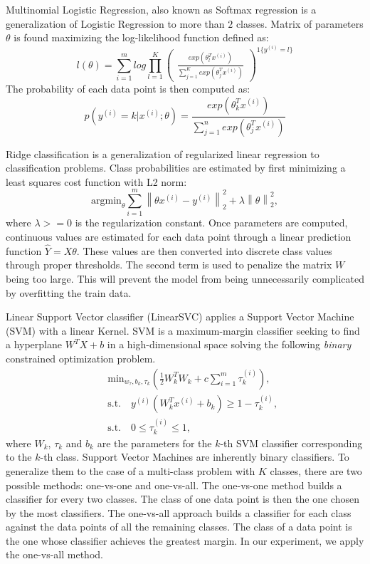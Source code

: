 Multinomial Logistic Regression, also known as Softmax regression is a generalization of Logistic Regression to more than $2$ classes.
Matrix of parameters $\theta$ is found maximizing the log-likelihood function defined as:
\begin{equation*}
	l(\theta) = \sum_{i=1}^{m} log \prod_{l=1}^K \begin{pmatrix}
\frac{exp(\theta_l^Tx^{(i)})}{\sum_{j=1}^K exp(\theta_j^Tx^{(i)})}
\end{pmatrix}^{1\{y^{(i)}=l\}}
\label{eq:softmax-likelihood}
\end{equation*}
The probability of each data point is then computed as:
\begin{equation*}
 p(y^{(i)}=k|x^{(i)};\theta)=\frac{exp(\theta^T_k x^{(i)})}{\sum_{j = 1}^{n} exp(\theta_j^T x^{(i)})}
\label{eq:softmax-prob}
\end{equation*}

Ridge classification is a generalization of regularized linear regression to classification problems.
Class probabilities are estimated by first minimizing a least squares cost function with L2 norm:
\begin{equation*}
\mathrm{argmin}_{\theta}\sum_{i = 1}^{m} \left\| \theta x^{(i)}-y^{(i)}\right\|_2^2 + \lambda \left\| \theta \right\|_2^2,
\label{eq:ridge-cost}
\end{equation*}
where $\lambda >= 0$ is the regularization constant.
Once parameters are computed, continuous values are estimated for each data point through a linear prediction function $\hat{Y} = X\theta$. 
These values are then converted into discrete class values through proper thresholds.
The second term is used to penalize the matrix $W$ being too large. This will prevent the model from being unnecessarily complicated by overfitting the train data.

Linear Support Vector classifier (LinearSVC) applies a Support Vector Machine (SVM) with a linear Kernel. 
SVM is a maximum-margin classifier seeking to find a hyperplane $W^T X + b$ in a high-dimensional space solving the following \textit{binary} constrained optimization problem.
\begin{eqnarray*}
&&\mathrm{min}_{w_\tau,b_k,\tau_k}(\frac{1}{2}W_k^TW_k +c\sum_{i = 1}^{m} \tau_k^{(i)}), \\
&&\mathrm{s.t.} \quad y^{(i)}(W^T_kx^{(i)}+b_k)\geq 1-\tau_k^{(i)}, \\ 
&&\mathrm{s.t.} \quad 0 \leq \tau_k^{(i)} \leq 1,
\end{eqnarray*}
where $W_k$, $\tau_k$ and $b_k$ are the parameters for the $k$-th SVM classifier corresponding to the $k$-th class.
Support Vector Machines are inherently binary classifiers. To generalize them to the case of a multi-class problem with $K$ classes, there are two possible methods: one-vs-one and one-vs-all. The one-vs-one method builds a classifier for every two classes. The class of one data point is then the one chosen by the most classifiers. The one-vs-all approach builds a classifier for each class against the data points of all the remaining classes. The class of a data point is the one whose classifier achieves the greatest margin. In our experiment, we apply the one-vs-all method.